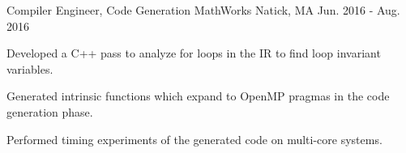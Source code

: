 
\begin{cventries}

  \cventry
    {Compiler Engineer, Code Generation} %
    {MathWorks} %
    {Natick, MA} %
    {Jun. 2016 - Aug. 2016} %
    {
      \begin{cvitems} %
      \item Developed a C++ pass to analyze for loops in the IR to find loop invariant
        variables.
      \item Generated intrinsic functions which expand to OpenMP pragmas in the code
        generation phase.
      \item Performed timing experiments of the generated code on multi-core systems.
      \end{cvitems}
    }
  
\end{cventries}